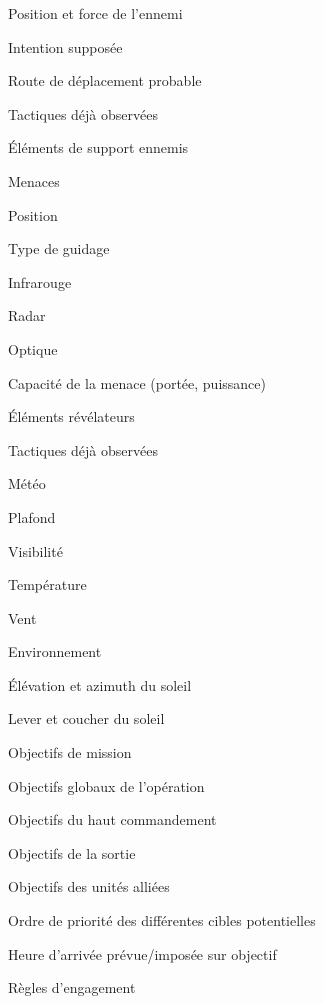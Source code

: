 \begin{e1}
    \begin{e2}
        \item Position et force de l’ennemi
        \begin{e3}
            \item Intention supposée
            \item Route de déplacement probable
            \item Tactiques déjà observées
        \end{e3}
        \item Éléments de support ennemis
        \item Menaces
        \begin{e3}
            \item Position
            \item Type de guidage
            \begin{e4}
                \item Infrarouge
                \item Radar
                \item Optique
            \end{e4}
            \item Capacité de la menace (portée, puissance)
            \item Éléments révélateurs
            \item Tactiques déjà observées
        \end{e3}
    \end{e2}
    \item Météo
    \begin{e2}
        \item Plafond
        \item Visibilité
        \item Température
        \item Vent
    \end{e2}
    \item Environnement
    \begin{e2}
        \item Élévation et azimuth du soleil
        \item Lever et coucher du soleil
    \end{e2}
    \item Objectifs de mission
    \begin{e2}
        \item Objectifs globaux de l’opération
        \item Objectifs du haut commandement
        \item Objectifs de la sortie
        \item Objectifs des unités alliées
        \item Ordre de priorité des différentes cibles potentielles
        \item Heure d’arrivée prévue/imposée sur objectif
        \item Règles d’engagement
    \end{e2}
\end{e1}




